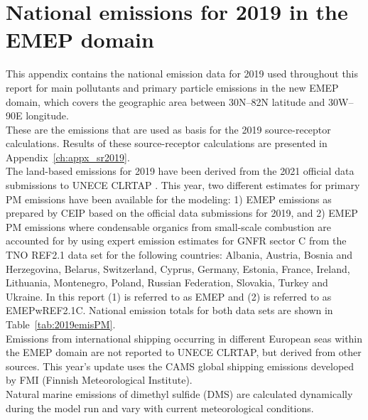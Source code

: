 \setcounter{page}{1}

\cleardoublepage
\chapter[2019 Emissions]{National emissions for 2019 in the EMEP domain}
\label{ch:appx_emis_2019}


This appendix contains the national emission data for 2019 used throughout this
report for main pollutants and  primary particle emissions in the new 
EMEP domain, which covers the geographic area between 30\degrees N--82\degrees N latitude and 30\degrees W--90\degrees E longitude. \\

These are the emissions that are used as basis
 for the 2019 source-receptor calculations. Results of these
 source-receptor calculations are presented in Appendix~\ref{ch:appx_sr2019}.\\

The land-based emissions for 2019 have been derived from the 2021
official data submissions to UNECE CLRTAP  \citep{CEIP2021}.
This year, two different estimates for primary PM emissions have been available for the modeling: 1) EMEP emissions as prepared by CEIP based on the official data submissions for 2019, and 2) EMEP PM emissions where condensable organics from small-scale combustion are accounted for by using expert emission estimates for GNFR sector C from the TNO REF2.1 data set for the following countries: Albania, Austria, Bosnia and Herzegovina, Belarus, Switzerland, Cyprus, Germany, Estonia, France,  Ireland, Lithuania, Montenegro, Poland, Russian Federation, Slovakia, Turkey and Ukraine.
In this report (1) is referred to as EMEP and (2) is referred to as EMEPwREF2.1C. National emission totals for both data sets are shown in Table~\ref{tab:2019emisPM}.  \\

Emissions from international shipping occurring in different European seas within the EMEP domain are not reported to UNECE CLRTAP, but derived from other sources. This year's update uses the CAMS global shipping emissions \citep{CAMSemis2019}  developed by FMI (Finnish Meteorological Institute).
\\

Natural marine emissions of dimethyl sulfide (DMS) are calculated dynamically during the model run and vary with current meteorological conditions. 

